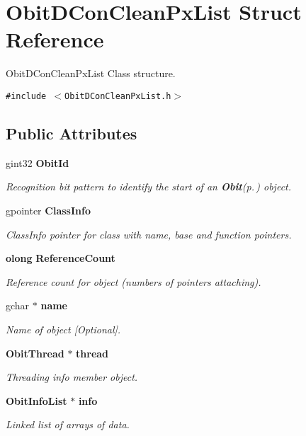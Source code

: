 \section{Obit\-DCon\-Clean\-Px\-List Struct Reference}
\label{structObitDConCleanPxList}
Obit\-DCon\-Clean\-Px\-List Class structure.  


{\tt \#include $<$Obit\-DCon\-Clean\-Px\-List.h$>$}

\subsection*{Public Attributes}
\begin{CompactItemize}
\item 
gint32 {\bf Obit\-Id}
\begin{CompactList}\small\item\em Recognition bit pattern to identify the start of an {\bf Obit}{\rm (p.\,\pageref{structObit})} object. \item\end{CompactList}\item 
gpointer {\bf Class\-Info}
\begin{CompactList}\small\item\em Class\-Info pointer for class with name, base and function pointers. \item\end{CompactList}\item 
{\bf olong} {\bf Reference\-Count}
\begin{CompactList}\small\item\em Reference count for object (numbers of pointers attaching). \item\end{CompactList}\item 
gchar $\ast$ {\bf name}
\begin{CompactList}\small\item\em Name of object [Optional]. \item\end{CompactList}\item 
{\bf Obit\-Thread} $\ast$ {\bf thread}
\begin{CompactList}\small\item\em Threading info member object. \item\end{CompactList}\item 
{\bf Obit\-Info\-List} $\ast$ {\bf info}
\begin{CompactList}\small\item\em Linked list of arrays of data. \item\end{CompactList}\item 

\end{CompactItemize}
